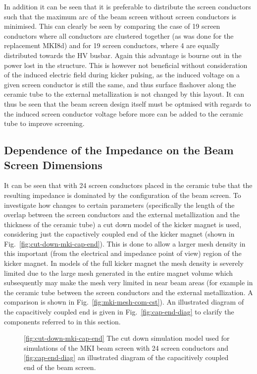 In addition it can be seen that it is preferable to distribute the screen conductors such that the maximum arc of the beam screen without screen conductors is minimised. This can clearly be seen by comparing the case of 19 screen conductors where all conductors are clustered together (as was done for the replacement MKI8d) and for 19 screen conductors, where 4 are equally distributed towards the HV busbar. Again this advantage is bourne out in the power lost in the structure. This is however not beneficial without consideration of the induced electric field during kicker pulsing, as the induced voltage on a given screen conductor is still the same, and thus surface flashover along the ceramic tube to the external metallization is not changed by this layout. It can thus be seen that the beam screen design itself must be optmised with regards to the induced screen conductor voltage before more can be added to the ceramic tube to improve screening.

\subsection{Dependence of the Impedance on the Beam Screen Dimensions}

It can be seen that with 24 screen conductors placed in the ceramic tube that the resulting impedance is dominated by the configuration of the beam screen. To investigate how changes to certain parameters (specifically the length of the overlap between the screen conductors and the external metallization and the thickness of the ceramic tube) a cut down model of the kicker magnet is used, considering just the capactively coupled end of the kicker magnet (shown in Fig.~\ref{fig:cut-down-mki-cap-end}). This is done to allow a larger mesh density in this important (from the electrical and impedance point of view) region of the kicker magnet. In models of the full kicker magnet the mesh density is severely limited due to the large mesh generated in the entire magnet volume which subsequently may make the mesh very limited in near beam areas (for example in the ceramic tube between the screen conductors and the external metallization. A comparison is shown in Fig.~\ref{fig:mki-mesh-com-cst}). An illustrated diagram of the capacitively coupled end is given in Fig.~\ref{fig:cap-end-diag} to clarify the components referred to in this section.

\begin{figure}
\subfigure[]{
\label{fig:cut-down-mki-cap-end}
}
\subfigure[]{
\label{fig:cap-end-diag}
}
\caption{\ref{fig:cut-down-mki-cap-end} The cut down simulation model used for simulations of the MKI beam screen with 24 screen conductors and \ref{fig:cap-end-diag} an illustrated diagram of the capacitively coupled end of the beam screen.}
\end{figure}


